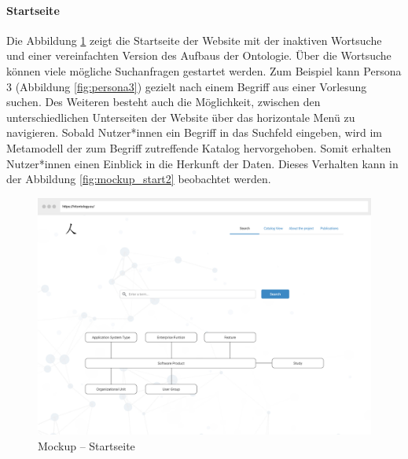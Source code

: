 \paragraph{Startseite}

Die Abbildung \ref{fig:mockup_start1} zeigt die Startseite der Website mit der inaktiven Wortsuche und einer vereinfachten Version des Aufbaus der Ontologie.
Über die Wortsuche können viele mögliche Suchanfragen gestartet werden.
Zum Beispiel kann Persona 3 (Abbildung \ref{fig:persona3}) gezielt nach einem Begriff aus einer Vorlesung suchen.
Des Weiteren besteht auch die Möglichkeit, zwischen den unterschiedlichen Unterseiten der Website über das horizontale Menü zu navigieren.
Sobald Nutzer*innen ein Begriff in das Suchfeld eingeben, wird im Metamodell der zum Begriff zutreffende Katalog hervorgehoben.
Somit erhalten Nutzer*innen einen Einblick in die Herkunft der Daten.
Dieses Verhalten kann in der Abbildung \ref{fig:mockup_start2} beobachtet werden.

\begin{figure}[H]
	\centering
    	\includegraphics[width=1.45\textwidth, angle=90]{Images/Mockup_Startseite_1}
   	\caption[Mockup -- Startseite]{Mockup -- Startseite}
   	\label{fig:mockup_start1}
\end{figure}

\clearpage

